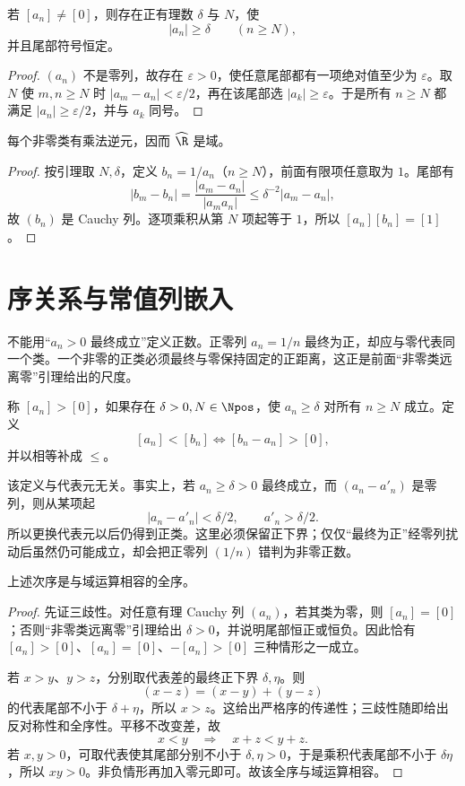\begin{lemma}[非零类远离零]
若 \([a_n]\ne[0]\)，则存在正有理数 \(\delta\) 与 \(N\)，使
\[
 |a_n|\ge\delta\qquad(n\ge N),
\]
并且尾部符号恒定。
\end{lemma}

\begin{proof}
\((a_n)\) 不是零列，故存在 \(\varepsilon>0\)，使任意尾部都有一项绝对值至少为 \(\varepsilon\)。取 \(N\) 使 \(m,n\ge N\) 时 \(|a_m-a_n|<\varepsilon/2\)，再在该尾部选 \(|a_k|\ge\varepsilon\)。于是所有 \(n\ge N\) 都满足 \(|a_n|\ge\varepsilon/2\)，并与 \(a_k\) 同号。
\end{proof}

\begin{theorem}
每个非零类有乘法逆元，因而 \(\widehat{\R}\) 是域。
\end{theorem}

\begin{proof}
按引理取 \(N,\delta\)，定义 \(b_n=1/a_n\)（\(n\ge N\)），前面有限项任意取为 \(1\)。尾部有
\[
 |b_m-b_n|=\frac{|a_m-a_n|}{|a_ma_n|}
 \le\delta^{-2}|a_m-a_n|,
\]
故 \((b_n)\) 是 Cauchy 列。逐项乘积从第 \(N\) 项起等于 \(1\)，所以 \([a_n][b_n]=[1]\)。
\end{proof}

\section{序关系与常值列嵌入}

不能用“\(a_n>0\) 最终成立”定义正数。正零列 \(a_n=1/n\) 最终为正，却应与零代表同一个类。一个非零的正类必须最终与零保持固定的正距离，这正是前面“非零类远离零”引理给出的尺度。


\begin{definition}
称 \([a_n]>[0]\)，如果存在 \(\delta>0,N\in\Npos\)，使 \(a_n\ge\delta\) 对所有 \(n\ge N\) 成立。定义
\[
 [a_n]<[b_n]\Longleftrightarrow[b_n-a_n]>[0],
\]
并以相等补成 \(\le\)。
\end{definition}

该定义与代表元无关。事实上，若 \(a_n\ge\delta>0\) 最终成立，而 \((a_n-a'_n)\) 是零列，则从某项起
\[
  |a_n-a'_n|<\delta/2,\qquad a'_n>\delta/2.
\]
所以更换代表元以后仍得到正类。这里必须保留正下界；仅仅“最终为正”经零列扰动后虽然仍可能成立，却会把正零列 \((1/n)\) 错判为非零正数。

\begin{theorem}
上述次序是与域运算相容的全序。
\end{theorem}

\begin{proof}
先证三歧性。对任意有理 Cauchy 列 \((a_n)\)，若其类为零，则 \([a_n]=[0]\)；否则“非零类远离零”引理给出 \(\delta>0\)，并说明尾部恒正或恒负。因此恰有 \([a_n]>[0]\)、\([a_n]=[0]\)、\(-[a_n]>[0]\) 三种情形之一成立。

若 \(x>y\)、\(y>z\)，分别取代表差的最终正下界 \(\delta,\eta\)。则
\[
  (x-z)=(x-y)+(y-z)
\]
的代表尾部不小于 \(\delta+\eta\)，所以 \(x>z\)。这给出严格序的传递性；三歧性随即给出反对称性和全序性。平移不改变差，故
\[
  x<y\quad\Longrightarrow\quad x+z<y+z.
\]
若 \(x,y>0\)，可取代表使其尾部分别不小于 \(\delta,\eta>0\)，于是乘积代表尾部不小于 \(\delta\eta\)，所以 \(xy>0\)。非负情形再加入零元即可。故该全序与域运算相容。
\end{proof}

